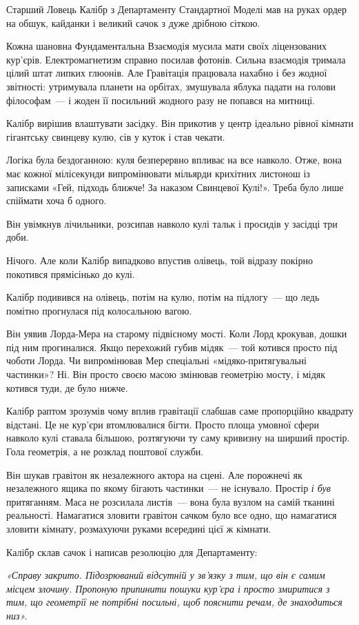 \documentclass[12pt, a4paper, openany]{book}
\begin{document}
\begin{terrybox}
Старший Ловець Калібр з Департаменту Стандартної Моделі мав на руках ордер на обшук, кайданки і великий сачок з дуже дрібною сіткою.

Кожна шановна Фундаментальна Взаємодія мусила мати своїх ліцензованих кур'єрів. Електромагнетизм справно посилав фотонів. Сильна взаємодія тримала цілий штат липких глюонів. Але Гравітація працювала нахабно і без жодної звітності: утримувала планети на орбітах, змушувала яблука падати на голови філософам~--- і жоден її посильний жодного разу не попався на митниці.

Калібр вирішив влаштувати засідку. Він прикотив у центр ідеально рівної кімнати гігантську свинцеву кулю, сів у куток і став чекати.

Логіка була бездоганною: куля безперервно впливає на все навколо. Отже, вона має кожної мілісекунди випромінювати мільярди крихітних листонош із записками «Гей, підходь ближче! За наказом Свинцевої Кулі!». Треба було лише спіймати хоча б одного.

Він увімкнув лічильники, розсипав навколо кулі тальк і просидів у засідці три доби.

Нічого. Але коли Калібр випадково впустив олівець, той відразу покірно покотився прямісінько до кулі.

\medskip
Калібр подивився на олівець, потім на кулю, потім на підлогу~--- що ледь помітно прогнулася під колосальною вагою.

Він уявив Лорда-Мера на старому підвісному мості. Коли Лорд крокував, дошки під ним прогиналися. Якщо перехожий губив мідяк~--- той котився просто під чоботи Лорда. Чи випромінював Мер спеціальні «мідяко-притягувальні частинки»? Ні. Він просто своєю масою змінював геометрію мосту, і мідяк котився туди, де було нижче.

Калібр раптом зрозумів чому вплив гравітації слабшав саме пропорційно квадрату відстані. Це не кур'єри втомлювалися бігти. Просто площа умовної сфери навколо кулі ставала більшою, розтягуючи ту саму кривизну на ширший простір. Гола геометрія, а не розклад поштової служби.

Він шукав гравітон як незалежного актора на сцені. Але порожнечі як незалежного ящика по якому бігають частинки~--- не існувало. Простір \textit{і був} притяганням. Маса не розсилала листів~--- вона була вузлом на самій тканині реальності. Намагатися зловити гравітон сачком було все одно, що намагатися зловити кімнату, розмахуючи руками всередині цієї ж кімнати.

\medskip
Калібр склав сачок і написав резолюцію для Департаменту:

\medskip
\textit{«Справу закрито. Підозрюваний відсутній у зв'язку з тим, що він є самим місцем злочину. Пропоную припинити пошуки кур'єра і просто змиритися з тим, що геометрії не потрібні посильні, щоб пояснити речам, де знаходиться низ».}
\end{terrybox}
\end{document}
